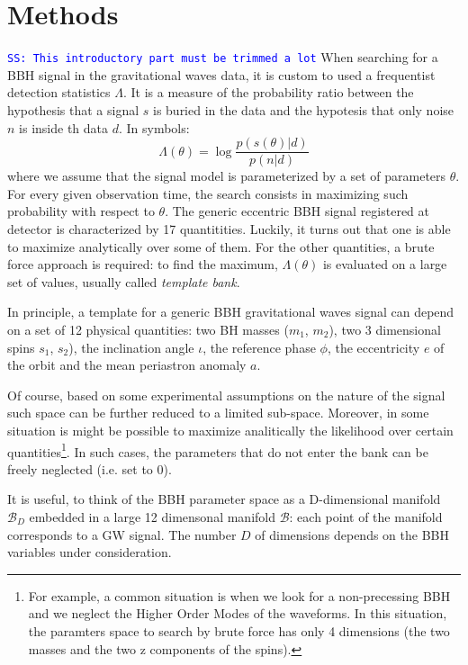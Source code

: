 \documentclass[twocolumn,showpacs,preprintnumbers,nofootinbib,prd,
superscriptaddress,10pt]{revtex4-1}
\newcommand{\stefano}[1]{{\textcolor{blue}{\texttt{SS: #1}} }}
\begin{document}
\section{Methods} \label{sec:methods}

\stefano{This introductory part must be trimmed a lot}
When searching for a BBH signal in the gravitational waves data, it is custom to used a frequentist detection statistics $\Lambda$. It is a measure of the probability ratio between the hypothesis that a signal $s$ is buried in the data and the hypotesis that only noise $n$ is inside th data $d$. In symbols:
\begin{equation}
	\Lambda(\theta) = \log\frac{p(s(\theta)|d)}{p(n|d)}
\end{equation}
where we assume that the signal model is parameterized by a set of parameters $\theta$.
For every given observation time, the search consists in maximizing such probability with respect to $\theta$. 
The generic eccentric BBH signal registered at detector is characterized by 17 quantitities. Luckily, it turns out that one is able to maximize analytically over some of them. For the other quantities, a brute force approach is required: to find the maximum, $\Lambda(\theta)$ is evaluated on a large set of values, usually called {\it template bank}. 

In principle, a template for a generic BBH gravitational waves signal can depend on a set of 12 physical quantities: two BH masses ($m_1$, $m_2$), two 3 dimensional spins $s_1$, $s_2$), the inclination angle $\iota$, the reference phase $\phi$, the eccentricity $e$ of the orbit and the mean periastron anomaly $a$.

Of course, based on some experimental assumptions on the nature of the signal such space can be further reduced to a limited sub-space. Moreover, in some situation is might be possible to maximize analitically the likelihood over certain quantities\footnote{
For example, a common situation is when we look for a non-precessing BBH and we neglect the Higher Order Modes of the waveforms. In this situation, the paramters space to search by brute force has only 4 dimensions (the two masses and the two z components of the spins).}.
In such cases, the parameters that do not enter the bank can be freely neglected (i.e. set to $0$).

It is useful, to think of the BBH parameter space as a D-dimensional manifold $\mathcal{B}_D$ embedded in a large 12 dimensonal manifold $\mathcal{B}$: each point of the manifold corresponds to a GW signal. The number $D$ of dimensions depends on the BBH variables under consideration.
\end{document}
